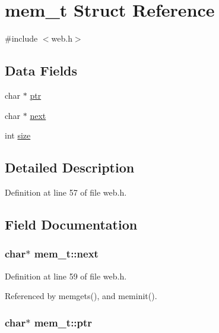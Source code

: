 \hypertarget{structmem__t}{}\section{mem\+\_\+t Struct Reference}
\label{structmem__t}


{\ttfamily \#include $<$web.\+h$>$}

\subsection*{Data Fields}
\begin{DoxyCompactItemize}
\item 
char $\ast$ \hyperlink{structmem__t_af9fd184846ee12236e952731fa592a74}{ptr}
\item 
char $\ast$ \hyperlink{structmem__t_a57b0ca2400c977d234c77e9d20a03c46}{next}
\item 
int \hyperlink{structmem__t_ab04d46fb2982c9a26a26244286c1b33b}{size}
\end{DoxyCompactItemize}


\subsection{Detailed Description}


Definition at line 57 of file web.\+h.



\subsection{Field Documentation}
\subsubsection[{\texorpdfstring{next}{next}}]{\setlength{\rightskip}{0pt plus 5cm}char$\ast$ mem\+\_\+t\+::next}\hypertarget{structmem__t_a57b0ca2400c977d234c77e9d20a03c46}{}\label{structmem__t_a57b0ca2400c977d234c77e9d20a03c46}


Definition at line 59 of file web.\+h.



Referenced by memgets(), and meminit().

\subsubsection[{\texorpdfstring{ptr}{ptr}}]{\setlength{\rightskip}{0pt plus 5cm}char$\ast$ mem\+\_\+t\+::ptr}\hypertarget{structmem__t_af9fd184846ee12236e952731fa592a74}{}\label{structmem__t_af9fd184846ee12236e952731fa592a74}


